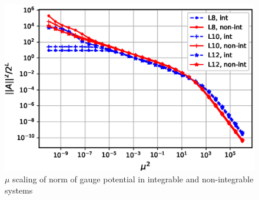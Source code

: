 \documentclass[11pt,a4paper]{article}
\begin{document}
\begin{figure}
\begin{center}
\includegraphics[scale=0.65]{norm_mu_scaling_all_L.eps}
\caption{$\mu$ scaling of norm of gauge potential in integrable and non-integrable systems}
\end{center}
\end{figure}
\end{document}
